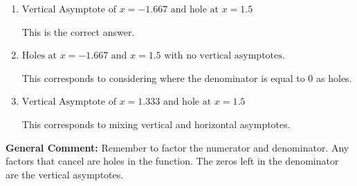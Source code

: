 \documentclass{extbook}[14pt]
\begin{document}
\begin{enumerate}
{\begin{enumerate}[label=\Alph*.]
This corresponds to not factoring out the hole.
\item \( \text{Vertical Asymptote of } x = -1.667 \text{ and hole at } x = 1.5 \)

This is the correct answer.
\item \( \text{Holes at } x = -1.667 \text{ and } x = 1.5 \text{ with no vertical asymptotes.} \)

This corresponds to considering where the denominator is equal to 0 as holes.
\item \( \text{Vertical Asymptote of } x = 1.333 \text{ and hole at } x = 1.5 \)

This corresponds to mixing vertical and horizontal asymptotes.
\end{enumerate}

\textbf{General Comment:} Remember to factor the numerator and denominator. Any factors that cancel are holes in the function. The zeros left in the denominator are the vertical asymptotes.
}
\end{enumerate}
\end{document}
